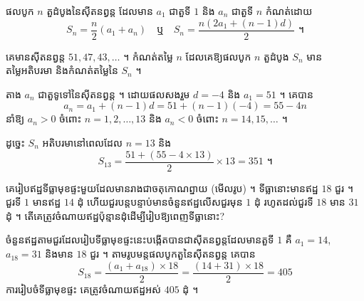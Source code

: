 \begin{formulaBox}[ជាទូទៅ]
ផលបូក $n$ តួដំបូងនៃស៊ីតនព្វន្ត ដែលមាន $a_1$ ជាតួទី $1$ និង $a_n$ ជាតួទី $n$ កំណត់ដោយ
\[
S_n = \frac{n}{2}(a_1 + a_n) \quad \text{ឬ} \quad S_n = \frac{n\left(2a_1 + (n - 1)d\right)}{2} \text{ ។}
\]
\end{formulaBox}

\begin{example}[លំហាត់គំរូ ១]
គេមានស៊ីតនព្វន្ត $51, 47, 43, \ldots$ ។ កំណត់តម្លៃ $n$ ដែលគេឱ្យផលបូក $n$ តួដំបូង $S_n$ មានតម្លៃអតិបរមា និងកំណត់តម្លៃនៃ $S_n$ ។
\end{example}
\ans
តាង $a_n$ ជាតួទូទៅនៃស៊ីតនព្វន្ត ។ ដោយផលសងរួម $d = -4$ និង $a_1 = 51$ ។ គេបាន
\[ a_n = a_1 + (n - 1)d = 51 + (n - 1)(-4) = 55 - 4n \]
នាំឱ្យ $a_n > 0$ ចំពោះ $n = 1, 2, \ldots, 13$ និង $a_n < 0$ ចំពោះ $n = 14, 15, \ldots$ ។

ដូច្នេះ $S_n$ អតិបរមានៅពេលដែល $n = 13$ និង
\[ S_{13} = \frac{51 + (55 - 4 \times 13)}{2} \times 13 = 351 \text{ ។} \]

\begin{example}[លំហាត់គំរូ ២]
គេរៀបឥដ្ឋទីធ្លាមុខផ្ទះមួយដែលមានរាងជាចតុកោណព្នាយ (មើលរូប) ។ ទីធ្លានោះមានឥដ្ឋ $18$ ជួរ ។ ជួរទី $1$ មានឥដ្ឋ $14$ ដុំ ហើយជួរបន្តបន្ទាប់មានចំនួនឥដ្ឋលើសជួរមុន $1$ ដុំ រហូតដល់ជួរទី $18$ មាន $31$ ដុំ ។ តើគេត្រូវចំណាយឥដ្ឋប៉ុន្មានដុំដើម្បីរៀបឱ្យពេញទីធ្លានោះ?

\begin{center}
\end{center}
\end{example}
\ans
ចំនួនឥដ្ឋតាមជួរដែលរៀបទីធ្លាមុខផ្ទះនេះបង្កើតបានជាស៊ីតនព្វន្តដែលមានតួទី $1$ គឺ $a_1 = 14$, $a_{18} = 31$ និងមាន $18$ ជួរ ។ តាមរូបមន្តផលបូកតួនៃស៊ីតនព្វន្ត គេបាន
\[ S_{18} = \frac{(a_1 + a_{18}) \times 18}{2} = \frac{(14 + 31) \times 18}{2} = 405 \]
ការរៀបចំទីធ្លាមុខផ្ទះ គេត្រូវចំណាយឥដ្ឋអស់ $405$ ដុំ ។

